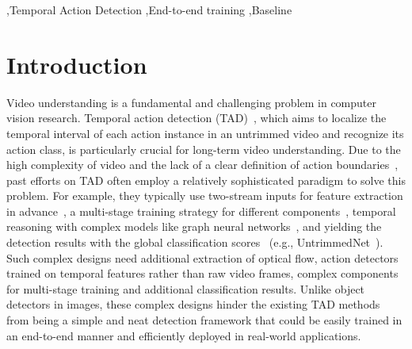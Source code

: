 \documentclass[a4paper,fleqn]{cas-dc}
\begin{document}
\begin{keywords}
 \sep Temporal Action Detection \sep End-to-end training \sep Baseline
\end{keywords}

\maketitle


\section{Introduction}\label{intro}
Video understanding is a fundamental and challenging problem in computer vision research. Temporal action detection (TAD)~\citep{THUMOS14,anet,fineaction}, which aims to localize the temporal interval of each action instance in an untrimmed video and recognize its action class, is particularly crucial for long-term video understanding. Due to the high complexity of video and the lack of a clear definition of action boundaries~\citep{moltisanti2017trespassingboundary}, past efforts on TAD often employ a relatively sophisticated paradigm to solve this problem. For example, they typically use two-stream inputs for feature extraction in advance~\citep{tcanet,a2net,rtd,pbrnet,afsd,sparse-rcnn-tad}, a multi-stage training strategy for different components~\citep{bsn,rtd}, temporal reasoning with complex models like graph neural networks~\citep{g-tad,DCAN,pgcn}, and yielding the detection results with the global classification scores~\citep{bmn,rtd,bsn} (e.g., UntrimmedNet~\citep{untrimmednet}). 
Such complex designs need additional extraction of optical flow, action detectors trained on temporal features rather than raw video frames, complex components for multi-stage training and additional classification results. Unlike object detectors in images, these complex designs hinder the existing TAD methods from being a simple and neat detection framework that could be easily trained in an end-to-end manner and efficiently deployed in real-world applications. 
\end{document}
